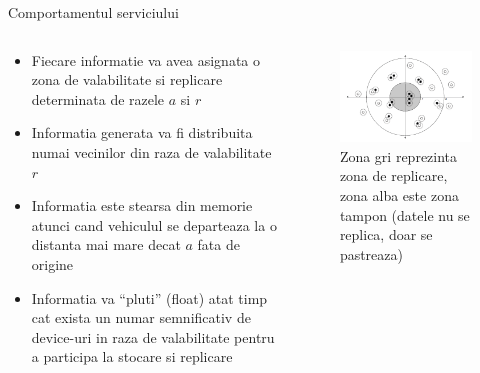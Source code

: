 \documentclass{beamer}
\begin{document}
\begin{frame}{Comportamentul serviciului}
	 \begin{columns}
	    \begin{column}[l]{0.55\textwidth}
			\begin{itemize}
			  \item Fiecare informatie va avea asignata o zona de valabilitate si
			  replicare determinata de razele $a$ si $r$
			  \item Informatia generata va fi distribuita numai vecinilor din raza de
			  valabilitate $r$
			  \item Informatia este stearsa din memorie atunci cand vehiculul se
			  departeaza la o distanta mai mare decat $a$ fata de origine
			  \item Informatia va “pluti” (float) atat timp cat exista un numar
			  semnificativ de device-uri in raza de valabilitate pentru a participa la
			  stocare si replicare
			\end{itemize}
		\end{column}
		\begin{column}[r]{0.45\textwidth}
			\begin{figure}
				\vspace*{-2cm}
				\centering
		    	\includegraphics[scale=0.35]{img/anchor_zone}
		    	\caption{Zona gri reprezinta zona de replicare, zona alba este zona
		    	tampon (datele nu se replica, doar se pastreaza)}
		    \end{figure}
		\end{column}
	\end{columns}
\end{frame}
\end{document}
